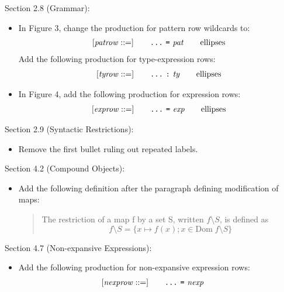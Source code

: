 \documentclass[twoside,titlepage]{article}
\begin{document}
\begin{appendix}
Section 2.8 (Grammar):
\begin{itemize}
\item In Figure 3, change the production for pattern row wildcards to: 
  $$
  \begin{array}{l@{\qquad}l@{\qquad}l}
   [\mathit{patrow} ::=] & \mbox{\tt...}~\mbox{\tt=}~\mathit{pat} & \textrm{ellipses}
  \end{array}
  $$
  Add the following production for type-expression rows: 
  $$
  \begin{array}{l@{\qquad}l@{\qquad}l}
   [\mathit{tyrow} ::=] & \mbox{\tt...}~\mbox{\tt:}~\mathit{ty} & \textrm{ellipses}
  \end{array}
  $$

\item In Figure 4, add the following production for expression rows: 
  $$
  \begin{array}{l@{\qquad}l@{\qquad}l}
   [\mathit{exprow} ::=] & \mbox{\tt...}~\mbox{\tt=}~\mathit{exp} & \textrm{ellipses}
  \end{array}
  $$
\end{itemize}

Section 2.9 (Syntactic Restrictions):
\begin{itemize}
\item Remove the first bullet ruling out repeated labels.
\end{itemize}

Section 4.2 (Compound Objects):
\begin{itemize}
\item Add the following definition after the paragraph defining modification of maps:
  \begin{quote}
  The restriction of a map f by a set S, written $f\setminus S$, is defined as
  $$
  f\setminus S = \{ x \mapsto f(x) ; x \in \mbox{Dom}\; f \setminus S \}
  $$
  \end{quote}
\end{itemize}

Section 4.7 (Non-expansive Expressions):
\begin{itemize}
\item Add the following production for non-expansive expression rows:
  $$
  \begin{array}{l@{\qquad}l@{\qquad}l}
   [\mathit{nexprow} ::=] & \mbox{\tt...}~\mbox{\tt=}~\mathit{nexp}
  \end{array}
  $$
\end{itemize}


\end{appendix}
\end{document}
